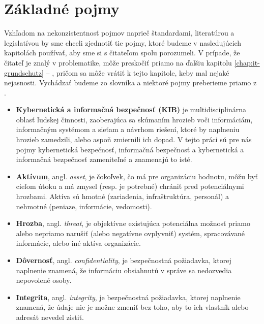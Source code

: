 \chapter{Základné pojmy}
\label{chap:terms}

Vzhľadom na nekonzistentnosť pojmov naprieč štandardami, literatúrou a legislatívou by sme chceli zjednotiť tie pojmy,
ktoré budeme v nasledujúcich kapitolách používať, aby sme si s čitateľom spolu porozumeli. V prípade, že čitateľ je
znalý v problematike, môže preskočiť priamo na ďalšiu kapitolu \ref{chap:it-grundschutz} -- ,
pričom sa môže vrátiť k tejto kapitole, keby mal nejaké nejasnosti. Vychádzať budeme zo slovníka \cite{KUDIKB-MVS} a niektoré
pojmy preberieme priamo z \cite{BP}.

\begin{itemize}
  \item \textbf{Kybernetická a informačná bezpečnosť (KIB)} je multidisciplinárna oblasť ľudskej činnosti, zaoberajúca sa skúmaním
    hrozieb voči informáciám, informačným systémom a sieťam a návrhom riešení, ktoré by naplneniu hrozieb zamedzili,
    alebo aspoň zmiernili ich dopad. V tejto práci sú pre nás pojmy kybernetická bezpečnosť, informačná bezpečnosť
    a kybernetická a informačná bezpečnosť zameniteľné a znamenajú to isté.

  \item \textbf{Aktívum}, angl. \textit{asset}, je čokoľvek, čo má pre organizáciu hodnotu, môžu byť cieľom útoku a má zmysel 
    (resp. je potrebné) chrániť pred potenciálnymi hrozbami. Aktíva sú hmotné (zariadenia, infraštruktúra, personál) a nehmotné
    (peniaze, informácie, vedomosti).

  \item \textbf{Hrozba}, angl. \textit{threat}, je objektívne existujúca potenciálna možnosť priamo alebo nepriamo narušiť
    (alebo negatívne ovplyvniť) systém, spracovávané informácie, alebo iné aktíva organizácie.

  \item \textbf{Dôvernosť}, angl. \textit{confidentiality}, je bezpečnostná požiadavka, ktorej naplnenie znamená, že informáciu
    obsiahnutú v správe sa nedozvedia nepovolené osoby.

  \item \textbf{Integrita}, angl. \textit{integrity}, je bezpečnostná požiadavka, ktorej naplnenie znamená, že údaje nie je
    možne zmeniť bez toho, aby to ich vlastník alebo adresát nevedel zistiť.


\end{itemize}
